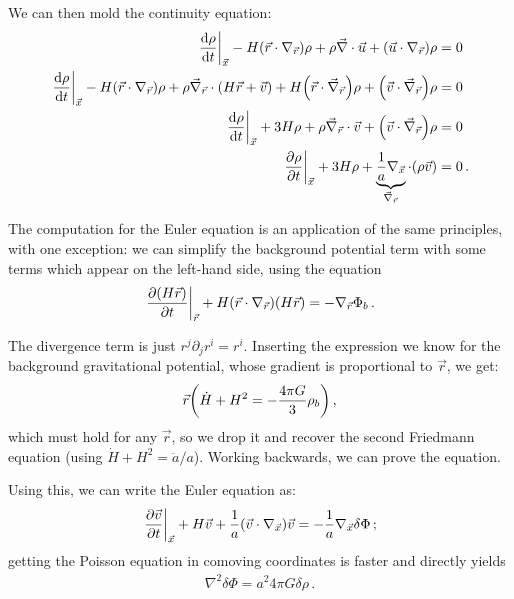 \documentclass[main.tex]{subfiles}
\begin{document}
We can then mold the continuity equation:
%
\begin{align}
\eval{\dv{\rho }{t} }_{\vec{x}}
- H \qty(\vec{r}\cdot \nabla_{\vec{r}}) \rho 
+ \rho \vec{\nabla} \cdot \vec{u} 
+ \qty(\vec{u} \cdot \nabla_{\vec{r}}) \rho &= 0  \\
\eval{\dv{\rho }{t} }_{\vec{x}}
- H \qty(\vec{r}\cdot \nabla_{\vec{r}}) \rho 
+ \rho \vec{\nabla}_{\vec{r}} \cdot \qty(H \vec{r} + \vec{v}) 
+ H \qty(\vec{r} \cdot \vec{\nabla}_{\vec{r}}) \rho 
+ \qty(\vec{v} \cdot \vec{\nabla}_{\vec{r}}) \rho
&= 0 \\
\eval{\dv{\rho }{t}}_{\vec{x}} 
+ 3 H \rho
+ \rho \vec{\nabla}_{\vec{r}} \cdot \vec{v} + \qty(\vec{v} \cdot \vec{\nabla}_{\vec{r}}) \rho &= 0  \\
\eval{\pdv{\rho }{t}}_{\vec{x}} + 3 H \rho + 
  \underbrace{\frac{1}{a} \nabla_{\vec{x}}}_{\vec{\nabla}_{\vec{r}}} \cdot \qty(\rho \vec{v}) &= 0
\,.
\end{align}

The computation for the Euler equation is an application of the same principles, with one exception: we can simplify the background potential term with some terms which appear on the left-hand side, using the equation
%
\begin{align}
  \eval{\pdv{(H \vec{r})}{t}}_{\vec{r}} + H \qty(\vec{r} \cdot \nabla_{\vec{r}}) (H\vec{r}) = - \nabla_{\vec{r}} \Phi_{b}
\,. 
\end{align}

The divergence term is just \(r^{j} \partial_{j} r^{i} = r^{i}\). Inserting the expression we know for the background gravitational potential, whose gradient is proportional to \(\vec{r}\), we get: 
%
\begin{align}
  \vec{r} \qty(\dot{H} +  H^2 = - \frac{4 \pi G }{3} \rho_{b } )
\,,
\end{align}
%
which must hold for any \(\vec{r}\), so we drop it and recover the second Friedmann equation (using \(\dot{H} + H^2= \ddot{a} / a\)). Working backwards, we can prove the equation. 

Using this, we can write the Euler equation as:
%
\begin{align}
  \eval{\pdv{\vec{v}}{t}}_{\vec{x}} + H \vec{v} + \frac{1}{a} \qty(\vec{v} \cdot \nabla_{\vec{x}}) \vec{v} = - \frac{1}{a} \nabla_{\vec{x}} \delta \Phi 
\,;
\end{align}
%
getting the Poisson equation in comoving coordinates is faster and directly yields 
%
\begin{align}
  \nabla^2 \delta \Phi = a^2 4 \pi G \delta \rho 
\,.
\end{align}
\end{document}
